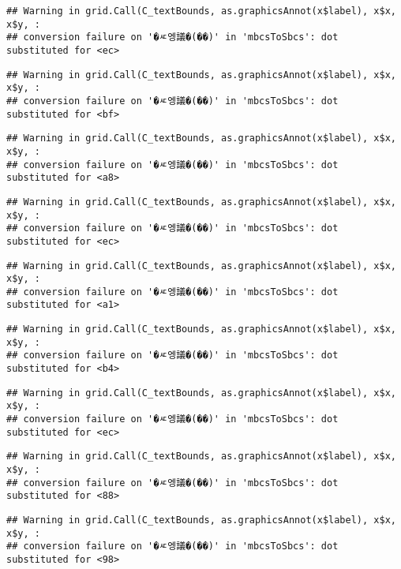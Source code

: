 \documentclass[
]{article}
\begin{document}
\begin{verbatim}
## Warning in grid.Call(C_textBounds, as.graphicsAnnot(x$label), x$x, x$y, :
## conversion failure on '�ㅼ엥議�(��)' in 'mbcsToSbcs': dot substituted for <ec>
\end{verbatim}

\begin{verbatim}
## Warning in grid.Call(C_textBounds, as.graphicsAnnot(x$label), x$x, x$y, :
## conversion failure on '�ㅼ엥議�(��)' in 'mbcsToSbcs': dot substituted for <bf>
\end{verbatim}

\begin{verbatim}
## Warning in grid.Call(C_textBounds, as.graphicsAnnot(x$label), x$x, x$y, :
## conversion failure on '�ㅼ엥議�(��)' in 'mbcsToSbcs': dot substituted for <a8>
\end{verbatim}

\begin{verbatim}
## Warning in grid.Call(C_textBounds, as.graphicsAnnot(x$label), x$x, x$y, :
## conversion failure on '�ㅼ엥議�(��)' in 'mbcsToSbcs': dot substituted for <ec>
\end{verbatim}

\begin{verbatim}
## Warning in grid.Call(C_textBounds, as.graphicsAnnot(x$label), x$x, x$y, :
## conversion failure on '�ㅼ엥議�(��)' in 'mbcsToSbcs': dot substituted for <a1>
\end{verbatim}

\begin{verbatim}
## Warning in grid.Call(C_textBounds, as.graphicsAnnot(x$label), x$x, x$y, :
## conversion failure on '�ㅼ엥議�(��)' in 'mbcsToSbcs': dot substituted for <b4>
\end{verbatim}

\begin{verbatim}
## Warning in grid.Call(C_textBounds, as.graphicsAnnot(x$label), x$x, x$y, :
## conversion failure on '�ㅼ엥議�(��)' in 'mbcsToSbcs': dot substituted for <ec>
\end{verbatim}

\begin{verbatim}
## Warning in grid.Call(C_textBounds, as.graphicsAnnot(x$label), x$x, x$y, :
## conversion failure on '�ㅼ엥議�(��)' in 'mbcsToSbcs': dot substituted for <88>
\end{verbatim}

\begin{verbatim}
## Warning in grid.Call(C_textBounds, as.graphicsAnnot(x$label), x$x, x$y, :
## conversion failure on '�ㅼ엥議�(��)' in 'mbcsToSbcs': dot substituted for <98>
\end{verbatim}
\end{document}
